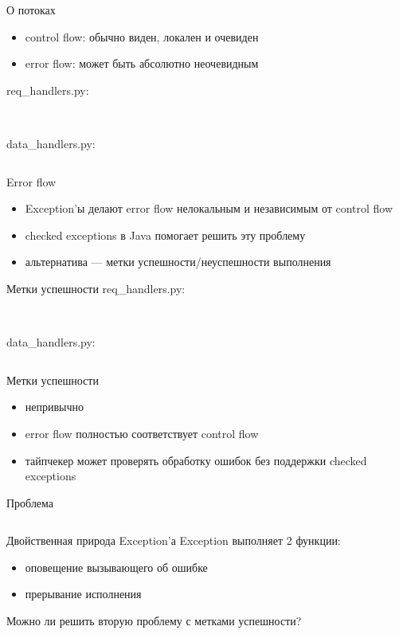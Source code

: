 \documentclass[10pt]{beamer}
\newcommand{\code}[4]{\inputminted[linenos, frame=none, firstline=#2, lastline=#3,
  framesep=10pt, bgcolor=lightgray]{#4}{#1}}
\begin{document}
\begin{frame}{О потоках}
  \begin{itemize}
  \item control flow: обычно виден, локален и очевиден
  \item error flow: может быть абсолютно неочевидным
  \end{itemize}
  req\_handlers.py:
  \code{code.py}{28}{32}{python}\vspace{5pt}\\
  data\_handlers.py:
  \code{code.py}{34}{38}{python}
\end{frame}

\begin{frame}{Error flow}
  \begin{itemize}
  \item Exception'ы делают error flow нелокальным и независимым от control flow
  \item checked exceptions в Java помогает решить эту проблему
  \item альтернатива — метки успешности/неуспешности выполнения
  \end{itemize}
\end{frame}

\begin{frame}{Метки успешности}
  req\_handlers.py:
  \code{code.py}{40}{42}{python}\vspace{5pt}\\
  data\_handlers.py:
  \code{code.py}{44}{46}{python}
\end{frame}

\begin{frame}{Метки успешности}
  \begin{itemize}
  \item непривычно
  \item error flow полностью соответствует control flow
  \item тайпчекер может проверять обработку ошибок без поддержки checked exceptions
  \end{itemize}
\end{frame}

\begin{frame}{Проблема}
  \code{code.py}{48}{55}{python}
\end{frame}

\begin{frame}{Двойственная природа Exception'а}
  Exception выполняет 2 функции:
  \begin{itemize}
  \item оповещение вызывающего об ошибке
  \item прерывание исполнения
  \end{itemize}
  Можно ли решить вторую проблему с метками успешности?
\end{frame}
\end{document}
